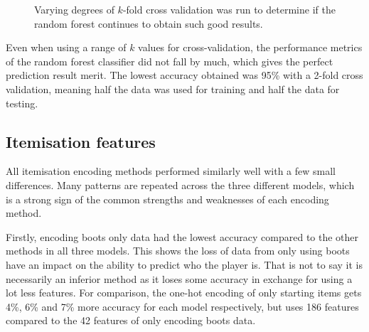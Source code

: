 \documentclass[Report.tex]{subfiles}
\begin{document}
\newcommand{\rfplotbar}[2] {
\addplot+[mark=none] table [x=cv, y=#1, col sep=comma] {data/15-game-rf.csv};
\addlegendentry{#2}
}
\begin{figure}[H]
\caption{Varying degrees of $k$-fold cross validation was run to determine if the random forest continues to obtain such good results.}
\end{figure}

Even when using a range of $k$ values for cross-validation, the performance metrics of the random forest classifier did not fall by much, which gives the perfect prediction result merit. The lowest accuracy obtained was 95\% with a 2-fold cross validation, meaning half the data was used for training and half the data for testing. 




\subsection{Itemisation features}

All itemisation encoding methods performed similarly well with a few small differences. Many patterns are repeated across the three different models, which is a strong sign of the common strengths and weaknesses of each encoding method. 

Firstly, encoding boots only data had the lowest accuracy compared to the other methods in all three models. This shows the loss of data from only using boots have an impact on the ability to predict who the player is. That is not to say it is necessarily an inferior method as it loses some accuracy in exchange for using a lot less features. For comparison, the one-hot encoding of only starting items gets 4\%, 6\% and 7\% more accuracy for each model respectively, but uses 186 features compared to the 42 features of only encoding boots data. 
\end{document}
